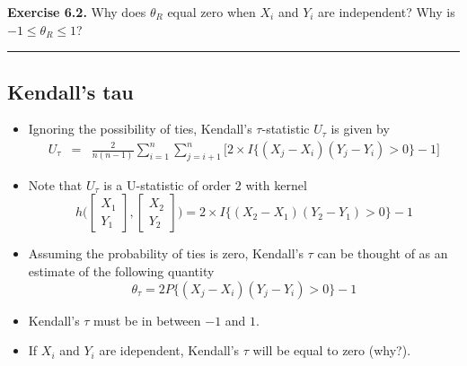 \documentclass[]{book}
\begin{document}
\textbf{Exercise 6.2.} Why does \(\theta_{R}\) equal zero when \(X_{i}\) and \(Y_{i}\) are independent?
Why is \(-1\leq \theta_{R} \leq 1\)?

\begin{center}\rule{0.5\linewidth}{\linethickness}\end{center}

\hypertarget{kendalls-tau}{%
\subsection{Kendall's tau}\label{kendalls-tau}}

\begin{itemize}
\item
  Ignoring the possibility of ties, Kendall's \(\tau\)-statistic \(U_{\tau}\) is given by
  \begin{eqnarray}
  U_{\tau}
  &=& \frac{2}{n(n-1)}\sum_{i=1}^{n}\sum_{j=i+1}^{n} \Bigg[ 2 \times I\Big\{ (X_{j} - X_{i})(Y_{j} - Y_{i}) > 0 \Big\}  - 1 \Bigg]
  \nonumber
  \end{eqnarray}
\item
  Note that \(U_{\tau}\) is a U-statistic of order \(2\) with kernel
  \begin{equation}
  h\Bigg( \begin{bmatrix} X_{1} \\ Y_{1} \end{bmatrix},
  \begin{bmatrix} X_{2} \\ Y_{2} \end{bmatrix} \Bigg)
  = 2 \times I\Big\{ (X_{2} - X_{1})(Y_{2} - Y_{1}) > 0 \Big\}  - 1
  \end{equation}
\end{itemize}

\begin{itemize}
\item
  Assuming the probability of ties is zero, Kendall's \(\tau\) can be thought of as an estimate of the following quantity
  \begin{equation}
  \theta_{\tau} = 2 P\Big\{ (X_{j} - X_{i})(Y_{j} - Y_{i}) > 0 \Big\} - 1
  \end{equation}
\item
  Kendall's \(\tau\) must be in between \(-1\) and \(1\).
\item
  If \(X_{i}\) and \(Y_{i}\) are idependent, Kendall's \(\tau\) will be equal to zero (why?).
\end{itemize}
\end{document}
